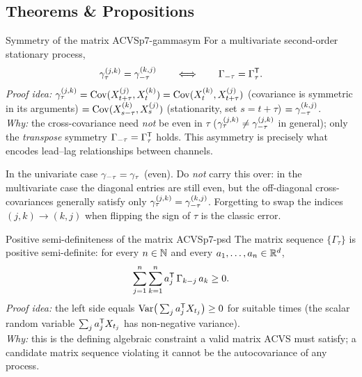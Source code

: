 \subsection{Theorems \& Propositions}

\begin{proposition}{Symmetry of the matrix ACVS}{p7-gammasym}
For a multivariate second-order stationary process,
\[
\gamma_\tau^{(j,k)}=\gamma_{-\tau}^{(k,j)}
\qquad\Longleftrightarrow\qquad
\Gamma_{-\tau}=\Gamma_\tau^{\mathsf{T}} .
\]
\textit{Proof idea:} $\gamma_\tau^{(j,k)}=\operatorname{Cov}(X_{t+\tau}^{(j)},X_t^{(k)})
=\operatorname{Cov}(X_t^{(k)},X_{t+\tau}^{(j)})$ (covariance is symmetric in its arguments)
$=\operatorname{Cov}(X_{s-\tau}^{(k)},X_s^{(j)})$ (stationarity, set $s=t+\tau$)
$=\gamma_{-\tau}^{(k,j)}$.\\
\textit{Why:} the cross-covariance need \emph{not} be even in $\tau$
($\gamma_\tau^{(j,k)}\ne\gamma_{-\tau}^{(j,k)}$ in general); only the
\emph{transpose} symmetry $\Gamma_{-\tau}=\Gamma_\tau^{\mathsf{T}}$ holds. This asymmetry
is precisely what encodes lead--lag relationships between channels.
\end{proposition}

\begin{pitfall}
In the univariate case $\gamma_{-\tau}=\gamma_\tau$ (even). Do \emph{not} carry
this over: in the multivariate case the diagonal entries are still even, but the
off-diagonal cross-covariances generally satisfy only
$\gamma_\tau^{(j,k)}=\gamma_{-\tau}^{(k,j)}$. Forgetting to swap the indices
$(j,k)\to(k,j)$ when flipping the sign of $\tau$ is the classic error.
\end{pitfall}

\begin{proposition}{Positive semi-definiteness of the matrix ACVS}{p7-psd}
The matrix sequence $\{\Gamma_\tau\}$ is positive semi-definite: for every
$n\in\mathbb{N}$ and every $a_1,\dots,a_n\in\mathbb{R}^d$,
\[
\sum_{j=1}^n\sum_{k=1}^n a_j^{\mathsf{T}}\,\Gamma_{k-j}\,a_k\ge0 .
\]
\textit{Proof idea:} the left side equals $\operatorname{Var}\!\big(\sum_{j}a_j^{\mathsf{T}} X_{t_j}\big)\ge0$
for suitable times (the scalar random variable $\sum_j a_j^{\mathsf{T}} X_{t_j}$ has
non-negative variance).\\
\textit{Why:} this is the defining algebraic constraint a valid matrix ACVS must
satisfy; a candidate matrix sequence violating it cannot be the autocovariance
of any process.
\end{proposition}

